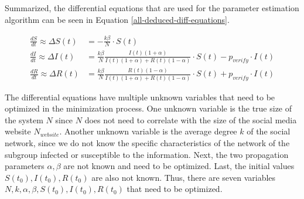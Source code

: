 Summarized, the differential equations that are used for the parameter estimation 
algorithm can be seen in Equation \ref{all-deduced-diff-equations}.

\begin{subequations}
    \begin{align}
        \frac{dS}{dt} \approx \Delta S(t) &= -\frac{k\beta}{N} \cdot S(t) \\
        \frac{dI}{dt} \approx \Delta I(t) &=  \frac{k\beta}{N} \frac{I(t)(1+\alpha)}{I(t)(1+\alpha)+R(t)(1-\alpha)}
        \cdot S(t) - p_{verify}\cdot I(t) \\
        \frac{dR}{dt} \approx \Delta R(t) &= \frac{k\beta}{N} \frac{R(t)(1-\alpha)}{I(t)(1+\alpha)+R(t)(1-\alpha)} 
        \cdot S(t) + p_{verify}\cdot I(t)
\end{align}
\label{all-deduced-diff-equations}
\end{subequations}


The differential equations have multiple unknown variables that need
to be optimized in the minimization process. One unknown variable is
the true size of the system $N$ since $N$ does not need to correlate 
with the size of the social media website $N_{website}$.
Another unknown variable is the average degree $k$ of the social network,
since we do not know the specific characteristics of the network of the
subgroup infected or susceptible to the information.
Next, the two propagation parameters $\alpha, \beta$ are not known
and need to be optimized. 
Last, the initial values $S(t_0), I(t_0), R(t_0)$ are also not known.
Thus, there are seven variables $N, k, \alpha, \beta, S(t_0), I(t_0), R(t_0)$
that need to be optimized.


